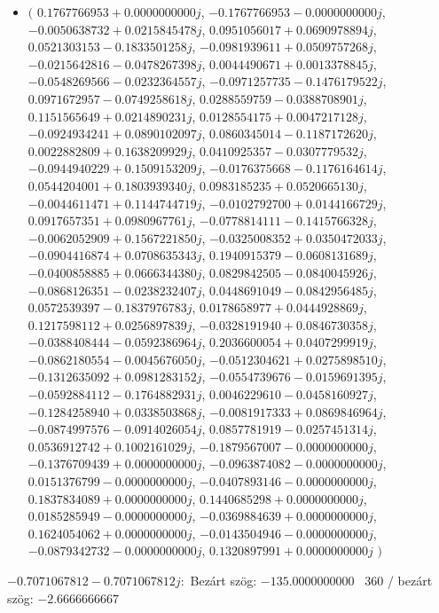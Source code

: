 \documentclass[14pt,a4paper]{article}
\begin{document}
\begin{itemize}
\item
$\big($
$0.1767766953+0.0000000000j$, $-0.1767766953-0.0000000000j$, $-0.0050638732+0.0215845478j$, $0.0951056017+0.0690978894j$, $0.0521303153-0.1833501258j$, $-0.0981939611+0.0509757268j$, $-0.0215642816-0.0478267398j$, $0.0044490671+0.0013378845j$, $-0.0548269566-0.0232364557j$, $-0.0971257735-0.1476179522j$, $0.0971672957-0.0749258618j$, $0.0288559759-0.0388708901j$, $0.1151565649+0.0214890231j$, $0.0128554175+0.0047217128j$, $-0.0924934241+0.0890102097j$, $0.0860345014-0.1187172620j$, $0.0022882809+0.1638209929j$, $0.0410925357-0.0307779532j$, $-0.0944940229+0.1509153209j$, $-0.0176375668-0.1176164614j$, $0.0544204001+0.1803939340j$, $0.0983185235+0.0520665130j$, $-0.0044611471+0.1144744719j$, $-0.0102792700+0.0144166729j$, $0.0917657351+0.0980967761j$, $-0.0778814111-0.1415766328j$, $-0.0062052909+0.1567221850j$, $-0.0325008352+0.0350472033j$, $-0.0904416874+0.0708635343j$, $0.1940915379-0.0608131689j$, $-0.0400858885+0.0666344380j$, $0.0829842505-0.0840045926j$, $-0.0868126351-0.0238232407j$, $0.0448691049-0.0842956485j$, $0.0572539397-0.1837976783j$, $0.0178658977+0.0444928869j$, $0.1217598112+0.0256897839j$, $-0.0328191940+0.0846730358j$, $-0.0388408444-0.0592386964j$, $0.2036600054+0.0407299919j$, $-0.0862180554-0.0045676050j$, $-0.0512304621+0.0275898510j$, $-0.1312635092+0.0981283152j$, $-0.0554739676-0.0159691395j$, $-0.0592884112-0.1764882931j$, $0.0046229610-0.0458160927j$, $-0.1284258940+0.0338503868j$, $-0.0081917333+0.0869846964j$, $-0.0874997576-0.0914026054j$, $0.0857781919-0.0257451314j$, $0.0536912742+0.1002161029j$, $-0.1879567007-0.0000000000j$, $-0.1376709439+0.0000000000j$, $-0.0963874082-0.0000000000j$, $0.0151376799-0.0000000000j$, $-0.0407893146-0.0000000000j$, $0.1837834089+0.0000000000j$, $0.1440685298+0.0000000000j$, $0.0185285949-0.0000000000j$, $-0.0369884639+0.0000000000j$, $0.1624054062+0.0000000000j$, $-0.0143504946-0.0000000000j$, $-0.0879342732-0.0000000000j$, $0.1320897991+0.0000000000j$
$\big)$
\end{itemize}
$-0.7071067812-0.7071067812j$:\
Bezárt szög: $-135.0000000000$ \
360 / bezárt szög: $-2.6666666667$\
\end{document}
